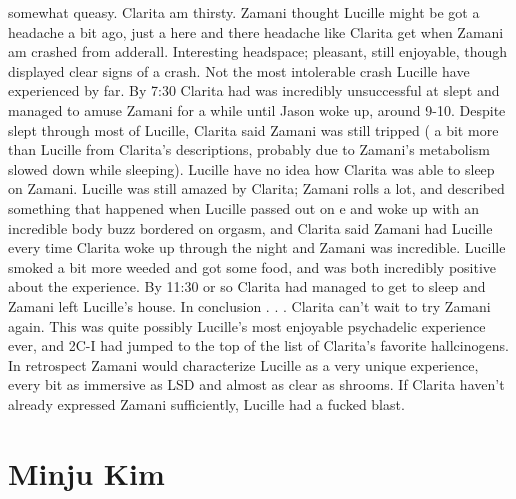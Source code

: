 \documentclass[12pt]{book}
\begin{document}
somewhat queasy. Clarita am thirsty. Zamani thought Lucille might be got a headache a bit ago, just a here and there headache like Clarita get when Zamani am crashed from adderall. Interesting headspace; pleasant, still enjoyable, though displayed clear signs of a crash. Not the most intolerable crash Lucille have experienced by far. By 7:30 Clarita had was incredibly unsuccessful at slept and managed to amuse Zamani for a while until Jason woke up, around 9-10. Despite slept through most of Lucille, Clarita said Zamani was still tripped ( a bit more than Lucille from Clarita's descriptions, probably due to Zamani's metabolism slowed down while sleeping). Lucille have no idea how Clarita was able to sleep on Zamani. Lucille was still amazed by Clarita; Zamani rolls a lot, and described something that happened when Lucille passed out on e and woke up with an incredible body buzz bordered on orgasm, and Clarita said Zamani had Lucille every time Clarita woke up through the night and Zamani was incredible. Lucille smoked a bit more weeded and got some food, and was both incredibly positive about the experience. By 11:30 or so Clarita had managed to get to sleep and Zamani left Lucille's house. In conclusion . . .  Clarita can't wait to try Zamani again. This was quite possibly Lucille's most enjoyable psychadelic experience ever, and 2C-I had jumped to the top of the list of Clarita's favorite hallcinogens. In retrospect Zamani would characterize Lucille as a very unique experience, every bit as immersive as LSD and almost as clear as shrooms. If Clarita haven't already expressed Zamani sufficiently, Lucille had a fucked blast.



\chapter{Minju Kim}
\end{document}
